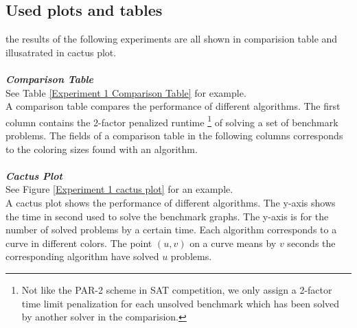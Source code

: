 \documentclass[12pt,a4paper,twoside]{scrartcl}
\numberwithin{equation}{section}
\begin{document}
\subsection{Used plots and tables}
the results of the following experiments are all shown in comparision table and  illusatrated in cactus plot.  \\
\\
\emph{\textbf{Comparison Table}}\\
See Table \ref{Experiment 1 Comparison Table} for example.\\
A comparison table compares the performance of different algorithms. The first column contains the 2-factor penalized runtime \footnote{Not like the PAR-2 scheme in SAT competition, we only  assign a 2-factor time limit penalization  for each unsolved benchmark which has been solved by another solver in the comparision.} of solving a set of benchmark problems. The fields of a comparison table in the following columns corresponds to the coloring sizes found with an algorithm.\\
\\
\emph{\textbf{Cactus Plot}}\\
See Figure \ref{Experiment 1 cactus plot} for an example.\\
A cactus plot shows the performance of different algorithms. The y-axis shows the time in second used to solve the benchmark graphs.  The y-axis is for the number of solved problems by a certain time. Each algorithm corresponds to a curve in different colors. The point $(u, v)$ on a curve means by $v$ seconds the corresponding algorithm have solved  $u$ problems.  \\
\end{document}
